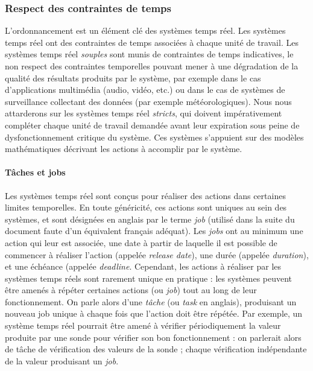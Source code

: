 			\subsubsection{Respect des contraintes de temps}

		L'ordonnancement est un élément clé des systèmes temps réel. Les systèmes temps réel ont des contraintes de temps associées à chaque unité de travail. Les systèmes temps réel \emph{souples} sont munis de contraintes de temps indicatives, le non respect des contraintes temporelles pouvant mener à une dégradation de la qualité des résultats produits par le système, par exemple dans le cas d'applications multimédia (audio, vidéo, etc.) ou dans le cas de systèmes de surveillance collectant des données (par exemple météorologiques). Nous nous attarderons sur les systèmes temps réel \emph{stricts}, qui doivent impérativement compléter chaque unité de travail demandée avant leur expiration sous peine de dysfonctionnement critique du système. Ces systèmes s'appuient sur des modèles mathématiques décrivant les actions à accomplir par le système.

		\paragraph{Tâches et jobs}
		Les systèmes temps réel sont conçus pour réaliser des actions dans certaines limites temporelles. En toute généricité, ces actions sont uniques au sein des systèmes, et sont désignées en anglais par le terme \emph{job} (utilisé dans la suite du document faute d'un équivalent français adéquat). Les \emph{jobs} ont au minimum une action qui leur est associée, une date à partir de laquelle il est possible de commencer à réaliser l'action (appelée \emph{release date}), une durée (appelée \emph{duration}), et une échéance (appelée \emph{deadline}.
		Cependant, les actions à réaliser par les systèmes temps réels sont rarement unique en pratique : les systèmes peuvent être amenés à répéter certaines actions (ou \emph{job}) tout au long de leur fonctionnement. On parle alors d'une \emph{tâche} (ou \emph{task} en anglais), produisant un nouveau job unique à chaque fois que l'action doit être répétée. Par exemple, un système temps réel pourrait être amené à vérifier périodiquement la valeur produite par une sonde pour vérifier son bon fonctionnement : on parlerait alors de tâche de vérification des valeurs de la sonde ; chaque vérification indépendante de la valeur produisant un \emph{job}.

